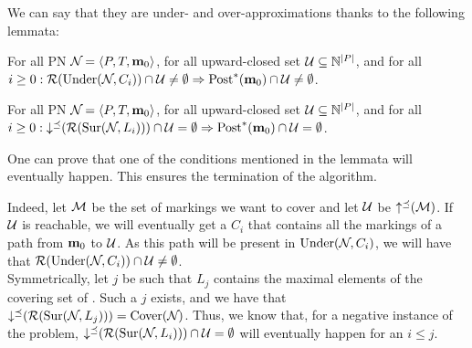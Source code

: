 We can say that they are under- and over-approximations thanks to the following lemmata:
\begin{lemm}
  For all \ac{PN} $\defPN$, for all upward-closed set $\mathcal{U} \subseteq \mathbb{N}^{\left|P\right|}$, and for all $i \geq 0: \operatorname{\mathcal{R}}(\operatorname{Under}(\mathcal{N}_{},C_i)) \cap \mathcal{U} \neq \emptyset \Rightarrow \operatorname{Post}^*_{{}}(\mathbf{m}_0) \cap \mathcal{U} \neq \emptyset$.
\end{lemm}
\begin{lemm}
  For all \ac{PN} $\defPN$, for all upward-closed set $\mathcal{U} \subseteq \mathbb{N}^{\left|P\right|}$, and for all $i \geq 0: \operatorname{\downarrow^\preceq}(\operatorname{\mathcal{R}}(\operatorname{Sur}(\mathcal{N}_{},L_i))) \cap \mathcal{U} = \emptyset \Rightarrow \operatorname{Post}^*_{{}}(\mathbf{m}_0) \cap \mathcal{U} = \emptyset$.
\end{lemm}

One can prove that one of the conditions mentioned in the lemmata will eventually happen.
This ensures the termination of the algorithm.

Indeed, let $\mathcal{M}$ be the set of markings we want to cover and let $\mathcal{U}$ be $\operatorname{\uparrow^\preceq}(\mathcal{M})$.
If $\mathcal{U}$ is reachable, we will eventually get a $C_i$ that contains all the markings of a path from $\mathbf{m}_0$ to $\mathcal{U}$.
As this path will be present in $\operatorname{Under}(\mathcal{N}_{}, C_i)$, we will have that $\operatorname{\mathcal{R}}(\operatorname{Under}(\mathcal{N}_{},C_i)) \cap \mathcal{U} \neq \emptyset$.\\
Symmetrically, let $j$ be such that $L_j$ contains the maximal elements of the covering set of \namePN.
Such a $j$ exists, and we have that $\operatorname{\downarrow^\preceq}(\operatorname{\mathcal{R}}(\operatorname{Sur}(\mathcal{N}_{},L_j))) = \operatorname{Cover}(\mathcal{N}_{})$.
Thus, we know that, for a negative instance of the problem, $\operatorname{\downarrow^\preceq}(\operatorname{\mathcal{R}}(\operatorname{Sur}(\mathcal{N}_{},L_i))) \cap \mathcal{U} = \emptyset$ will eventually happen for an $i \leq j$.
